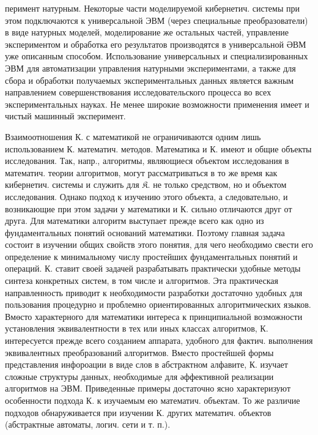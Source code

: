 \documentclass[10pt]{article}
\begin{document}
перимент натурным. Некоторые части моделируемой кибернетич. системы при этом подключаются к универсальной ЭВМ (через специальные преобразователи) в виде натурных моделей, моделирование же остальных частей, управление экспериментом и обработка его результатов производятся в универсальной ӘВМ уже описанным способом. Использование универсальных и специализированных ЭВМ для автоматизации управления натурными экспериментами, а также для сбора и обработки получаемых экспериментальных данных является важным направлением совершенствования исследовательского процесса во всех экспериментальных науках. Не менее широкие возможности применения имеет и чистый машинный эксперимент.



Взаимоотношения $К$. с математикой не ограничиваются одним лишь использованием К. математич. методов. Математика и К. имеют и общие объекты исследования. Так, напр., алгоритмы, являющиеся объектом исследования в математич. теории алгоритмов, могут рассматриваться в то же время как кибернетич. системы и служить для $\mathfrak{K}$. не только средством, но и объектом исследования. Однако подход к изучению этого объекта, а следовательно, и возникающие при этом задачи у математики и К. сильно отличаются друг от друга. Для математики алгоритм выступает прежде всего как одно из фундаментальных понятий оснований математики. Поэтому главная задача состоит в изучении общих свойств этого понятия, для чего необходимо свести его определение к минимальному числу простейших фундаментальных понятий и операций. К. ставит своей задачей разрабатывать практически удобные методы синтеза конкретных систем, в том числе и алгоритмов. Эта практическая направленность приводит к необходимости разработки достаточно удобных для пользования процедурно и проблемно ориентированных алгоритмических языков. Вмөсто характерного для математики интереса к принципиальной возможности установления эквивалентности в тех или иных классах алгоритмов, К. интересуется прежде всего созданием аппарата, удобного для фактич. выполнения эквивалентных преобразований алгоритмов. Вместо простейшей формы представления инфороации в виде слов в абстрактном алфавите, К. изучает сложные структуры данных, необходимые для әффективной реализации алгоритмов на ЭВМ. Приведенные примеры достаточно ясно характеризуют особенности подхода К. к изучаемым ею математич. объектам. То же различие подходов обнаруживается при изучении К. других математич. объектов (абстрактные автоматы, логич. сети и т. п.).
\end{document}
